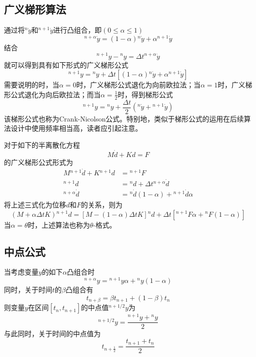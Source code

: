 \subsection{广义梯形算法}
通过将${^n\!\dot{y}}$和${^{n+1}\!\dot{y}}$进行凸组合\cite{book:dover,Wood}，即$(0\le\alpha\le1)$
\begin{equation}
{^{n+\alpha}\!\dot{y}}=(1-\alpha){^n\!\dot{y}}+\alpha{^{n+1}\!\dot{y}}
\end{equation}
结合
\begin{equation}
{^{n+1}\!y}-{^n\!y}=\Delta t{^{n+\alpha}\!\dot{y}}
\end{equation}
就可以得到具有如下形式的广义梯形公式
\begin{equation}
{^{n+1}\!y}={^n\!y}+\Delta t[(1-\alpha){^n\!\dot{y}}+\alpha{^{n+1}\!\dot{y}}]
\end{equation}
需要说明的时，当$\alpha=0$时，广义梯形公式退化为向前欧拉法；当$\alpha=1$时，广义梯形公式退化为向后欧拉法；而当$\alpha=\frac12$时，得到梯形公式
\begin{equation}
{^{n+1}\!y}={^n\!y}+\frac{\Delta t}{2}({^n\!\dot{y}}+{^{n+1}\!\dot{y}})
\end{equation}
该梯形公式也称为Crank-Nicolson公式。特别地，类似于梯形公式的运用在后续算法设计中使用频率相当高，读者应引起注意。

对于如下的半离散化方程
\begin{equation}
M\dot{d}+Kd=F
\end{equation}
的广义梯形公式形式为
\begin{align}
M{^{n+1}\!\dot{d}}+K{^{n+1}\!d}&={^{n+1}\!F}\\
{^{n+1}\!d}&={^n\!d}+\Delta t{^{n+\alpha}\!\dot{d}}\\
{^{n+\alpha}\!\dot{d}}&={^n\!\dot{d}}(1-\alpha)+{^{n+1}\!\dot{d}}\alpha
\end{align}
将上述三式化为位移$d$和$F$的关系，则为
\begin{equation}
(M+\alpha\Delta tK){^{n+1}\!d}=[M-(1-\alpha)\Delta tK]{^n\!d}+\Delta t[{^{n+1}\!F}\alpha+{^n\!F}(1-\alpha)]
\end{equation}
当$\alpha=\theta$时，上述算法也称为$\theta$-格式\cite{Wood}。
\subsection{中点公式}
当考虑变量$y$的如下$\alpha$凸组合时
\begin{equation}
{^{n+\alpha}\!y}={^{n+1}\!y}\alpha+{^n\!y}(1-\alpha)
\end{equation}
同时，关于时间$t$的$\beta$凸组合有
\begin{equation}
t_{n+\beta}=\beta t_{n+1}+(1-\beta)t_n
\end{equation}
则变量$y$在区间$[t_n,t_{n+1}]$的中点值${^{n+1/2}\!y}$为
\begin{equation}
{^{n+1/2}\!y}=\frac{{^{n+1}\!y}+{^n\!y}}{2}
\end{equation}
与此同时，关于时间的中点值为
\begin{equation}
t_{n+\frac{1}{2}}=\frac{t_{n+1}+t_n}{2}
\end{equation}

